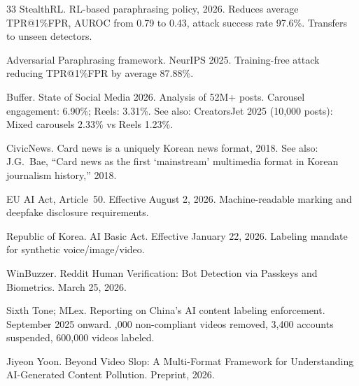 \documentclass[12pt]{article}
\begin{document}
\begin{thebibliography}{33}
StealthRL.
\newblock RL-based paraphrasing policy, 2026.
\newblock Reduces average TPR@1\%FPR, AUROC from 0.79 to 0.43, attack success rate 97.6\%. Transfers to unseen detectors.

Adversarial Paraphrasing framework.
\newblock NeurIPS 2025.
\newblock Training-free attack reducing TPR@1\%FPR by average 87.88\%.

Buffer.
\newblock State of Social Media 2026.
\newblock Analysis of 52M+ posts. Carousel engagement: 6.90\%; Reels: 3.31\%.
\newblock See also: CreatorsJet 2025 (10,000 posts): Mixed carousels 2.33\% vs Reels 1.23\%.

CivicNews.
\newblock Card news is a uniquely Korean news format, 2018.
\newblock See also: J.G.~Bae, ``Card news as the first `mainstream' multimedia format in Korean journalism history,'' 2018.

EU AI Act, Article~50.
\newblock Effective August 2, 2026.
\newblock Machine-readable marking and deepfake disclosure requirements.

Republic of Korea.
\newblock AI Basic Act.
\newblock Effective January 22, 2026.
\newblock Labeling mandate for synthetic voice/image/video.

WinBuzzer.
\newblock Reddit Human Verification: Bot Detection via Passkeys and Biometrics.
\newblock March 25, 2026.

Sixth Tone; MLex.
\newblock Reporting on China's AI content labeling enforcement.
\newblock September 2025 onward.
,000 non-compliant videos removed, 3,400 accounts suspended, 600,000 videos labeled.

Jiyeon Yoon.
\newblock Beyond Video Slop: A Multi-Format Framework for Understanding AI-Generated Content Pollution.
\newblock Preprint, 2026.

\end{thebibliography}
\end{document}
